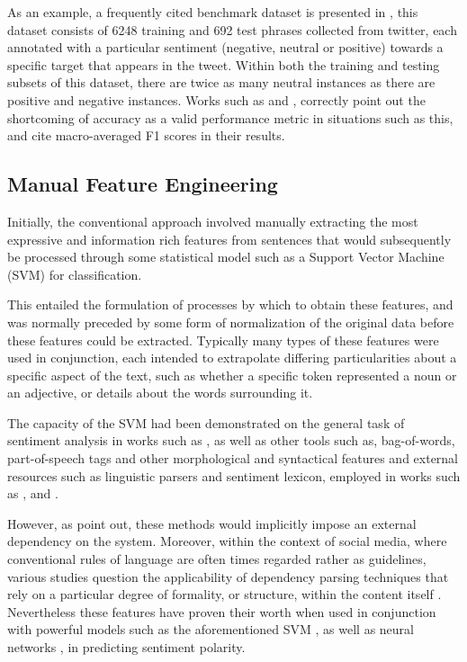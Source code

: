 \documentclass[../../fyp.tex]{subfiles}
\begin{document}
As an example, a frequently cited benchmark dataset is presented in \citep{dong}, this dataset consists of 6248 training and 692 test phrases collected from twitter, each annotated with a particular sentiment (negative, neutral or positive) towards a specific target that appears in the tweet. Within both the training and testing subsets of this dataset, there are twice as many neutral instances as there are positive and negative instances. Works such as \citet{chen2017} and \citet{dong}, correctly point out the shortcoming of accuracy as a valid performance metric in situations such as this, and cite macro-averaged F1 scores in their results.

\subsection{Manual Feature Engineering}
Initially, the conventional approach involved manually extracting the most expressive and information rich features from sentences that would subsequently be processed through some statistical model such as a Support Vector Machine (SVM) for classification.

This entailed the formulation of processes by which to obtain these features, and was normally preceded by some form of normalization of the original data before these features could be extracted. Typically many types of these features were used in conjunction, each intended to extrapolate differing particularities about a specific aspect of the text, such as whether a specific token represented a noun or an adjective, or details about the words surrounding it.

The capacity of the SVM had been demonstrated on the general task of sentiment analysis in works such as \citet{pang2002}, as well as other tools such as, bag-of-words, part-of-speech tags and other morphological and syntactical features and external resources such as linguistic parsers and sentiment lexicon, employed in works such as \citet{dong}, \citet{vo2015} and \citet{nguyen2015}.

However, as \citep{tang2016b} point out, these methods would implicitly impose an external dependency on the system. Moreover, within the context of social media, where conventional rules of language are often times regarded rather as guidelines, various studies question the applicability of dependency parsing techniques that rely on a particular degree of formality, or structure, within the content itself \citep{tang2016b,chen2017}. Nevertheless these features have proven their worth when used in conjunction with powerful models such as the aforementioned SVM \citep{kiritchenko,wagner2014}, as well as neural networks \citep{dong,vo2015}, in predicting sentiment polarity.
\end{document}

